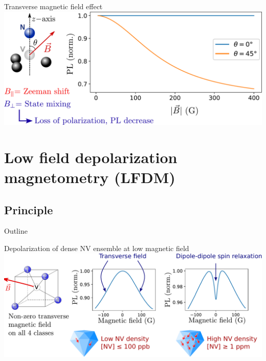 \documentclass{beamer}
\begin{document}
\begin{frame}{Transverse magnetic field effect}
\centering
\includegraphics[width=\textwidth,height=0.85\textheight,keepaspectratio]{Slide_champs_transverse_allege}
\end{frame}



\section{Low field depolarization magnetometry (LFDM)}
\subsection{Principle}
\begin{frame}{Outline}
\tableofcontents[currentsection]
\end{frame}

\begin{frame}{Depolarization of dense NV ensemble at low magnetic field}
\centering
\includegraphics[width=\textwidth,height=0.85\textheight,keepaspectratio]{slide_presentation_sujet}
\end{frame}
\end{document}

